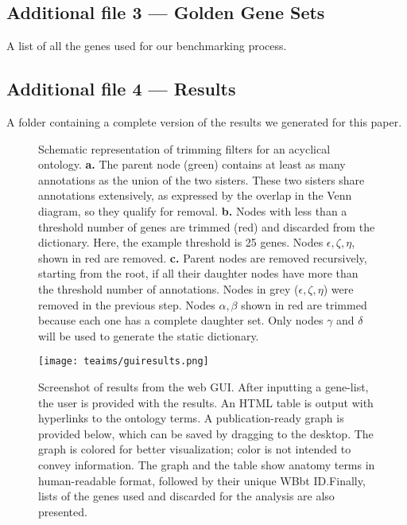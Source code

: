   \subsection*{Additional file 3 --- Golden Gene Sets}
    A list of all the genes used for our benchmarking process.
  \subsection*{Additional file 4 --- Results}
    A folder containing a complete version of the results we generated for this
    paper.

%
%
\begin{figure}
  \centering
\label{fig:simdiagram}
  \caption{Schematic representation of trimming filters for an acyclical
           ontology.
    \textbf{a.}
    The parent node (green) contains at least as many
    annotations as the union of the two sisters. These two sisters share
    annotations extensively, as expressed by the overlap in the Venn diagram,
    so they qualify for removal.
  	\textbf{b.}
    Nodes with less than a threshold number of genes are
    trimmed (red) and discarded from the dictionary. Here, the example threshold
    is 25 genes. Nodes $\epsilon, \zeta, \eta$, shown in red are removed.
  	\textbf{c.}
    Parent nodes are removed recursively, starting from
    the root, if all their daughter nodes have more than the threshold number of
    annotations. Nodes in grey ($\epsilon, \zeta, \eta$) were removed in the
    previous step. Nodes $\alpha, \beta$ shown in red are trimmed because each one
    has a complete daughter set. Only nodes $\gamma$ and $\delta$ will be used to
    generate the static dictionary.}
\end{figure}


\begin{figure}[htbp]
	\centering
    \texttt{[image: teaims/guiresults.png]}
 	\caption{
  Screenshot of results from the web GUI.
	After inputting a gene-list, the user is provided with the results. An HTML
  table is output with hyperlinks to the ontology terms. A publication-ready
  graph is provided below, which can be saved by  dragging to the desktop. The
  graph is colored for better visualization; color is not intended to convey
  information. The graph and the table show anatomy terms in  human-readable
  format, followed by their unique WBbt ID.\@ Finally, lists  of the genes used
  and discarded for the analysis are also presented.}
\label{fig:GUIresults}
\end{figure}

